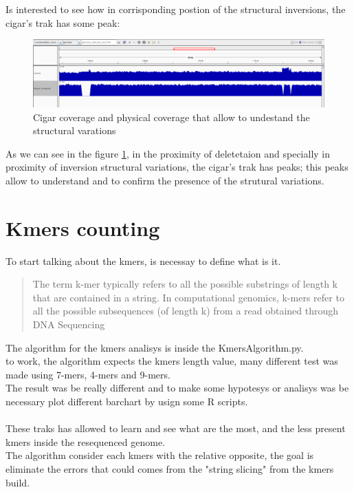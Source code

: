 Is interested to see how in corrisponding postion of the structural inversions, the cigar's trak has some peak:

 \begin{figure}[H]
				\centering
				\includegraphics[scale=0.45]{immagini/cigar_coverage_2.png}
				\caption{Cigar coverage and physical coverage that allow to undestand the structural varations}\label{fig:16}
				\end{figure}	
As we can see in the figure \ref{fig:16}, in the proximity of deletetaion and specially in proximity of inversion structural variations, the cigar's trak has peaks; this peaks allow to understand and to confirm the presence of the strutural variations.		

						
\section{Kmers counting}
To start talking about the kmers, is necessay to define what is it.
\begin{quote}
The term k-mer typically refers to all the possible substrings of length k that are contained in a string. In computational genomics, k-mers refer to all the possible subsequences (of length k) from a read obtained through DNA Sequencing
\end{quote}

The algorithm for the kmers analisys is inside the KmersAlgorithm.py.\\
to work, the algorithm expects the kmers length value, many different test was made using 7-mers, 4-mers and 9-mers.\\
The result was be really different and to make some hypotesys or analisys was be necessary plot different barchart by usign some R scripts.\\\\

These traks has allowed to learn and see what are the most, and the less present kmers inside the resequenced genome.\\

The algorithm consider each kmers with the relative opposite, the goal is eliminate the errors that could comes from the "string slicing" from the kmers build.\\\\

